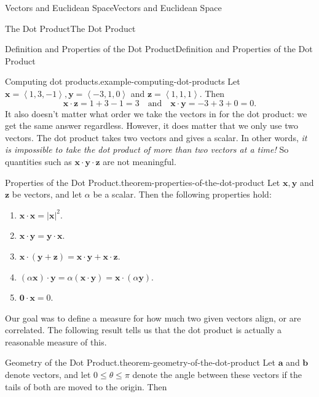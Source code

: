 \documentclass[10pt,]{book}
\numberwithin{equation}{section}
\newcommand{\vv}[1]{\mathbf{#1}}
\newcommand{\dotprod}[1]{\left\langle #1 \right\rangle}
\begin{document}
\begin{chapterptx}{Vectors and Euclidean Space}{}{Vectors and Euclidean Space}{}{}
\begin{sectionptx}{The Dot Product}{}{The Dot Product}{}{}
\begin{subsectionptx}{Definition and Properties of the Dot Product}{}{Definition and Properties of the Dot Product}{}{}
\begin{example}{Computing dot products.}{example-computing-dot-products}
\hypertarget{p-914}{}%
Let \(\vv{x} = \dotprod{1,3,-1},\vv{y} = \dotprod{-3,1,0}\) and \(\vv{z} = \dotprod{1,1,1}\). Then%
%
\begin{equation*}
\vv{x}\cdot\vv{z} = 1+3-1 = 3\quad\text{and}\quad\vv{x}\cdot\vv{y} = -3+3+0 = 0.
\end{equation*}
\hypertarget{p-915}{}%
It also doesn't matter what order we take the vectors in for the dot product: we get the same answer regardless. However, it does matter that we only use two vectors. The dot product takes two vectors and gives a scalar. In other words, \emph{it is impossible to take the dot product of more than two vectors at a time!} So quantities such as \(\vv{x}\cdot\vv{y}\cdot\vv{z}\) are not meaningful.%
\end{example}
\begin{theorem}{Properties of the Dot Product.}{}{theorem-properties-of-the-dot-product}%
\hypertarget{p-916}{}%
Let \(\vv{x},\vv{y}\) and \(\vv{z}\) be vectors, and let \(\alpha\) be a scalar. Then the following properties hold:%
\leavevmode%
\begin{multicols}{2}
\begin{enumerate}
\item\hypertarget{li-76}{}\hypertarget{p-917}{}%
\(\vv{x}\cdot\vv{x} = |\vv{x}|^{2}.\)%
\item\hypertarget{li-77}{}\hypertarget{p-918}{}%
\(\vv{x}\cdot\vv{y} = \vv{y}\cdot\vv{x}.\)%
\item\hypertarget{li-78}{}\hypertarget{p-919}{}%
\(\vv{x}\cdot(\vv{y}+\vv{z}) = \vv{x}\cdot\vv{y}+\vv{x}\cdot\vv{z}.\)%
\item\hypertarget{li-79}{}\hypertarget{p-920}{}%
\((\alpha\vv{x})\cdot\vv{y} = \alpha(\vv{x}\cdot\vv{y}) = \vv{x}\cdot(\alpha\vv{y}).\)%
\item\hypertarget{li-80}{}\hypertarget{p-921}{}%
\(\vv{0}\cdot\vv{x} = 0.\)%
\end{enumerate}
\end{multicols}
\end{theorem}
\hypertarget{p-922}{}%
Our goal was to define a measure for how much two given vectors align, or are correlated. The following result tells us that the dot product is actually a reasonable measure of this.%
\begin{theorem}{Geometry of the Dot Product.}{}{theorem-geometry-of-the-dot-product}%
\hypertarget{p-923}{}%
Let \(\vv{a}\) and \(\vv{b}\) denote vectors, and let \(0\leq\theta\leq\pi\) denote the angle between these vectors if the tails of both are moved to the origin. Then%

\end{theorem}
\end{subsectionptx}
\end{sectionptx}
\end{chapterptx}
\end{document}
